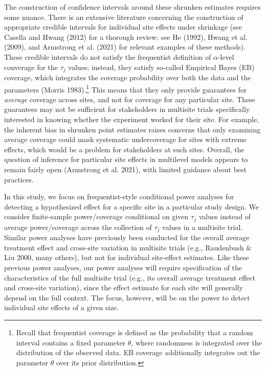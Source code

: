 \documentclass[]{article}
\begin{document}
The construction of confidence intervals around these shrunken estimates requires some nuance.
There is an extensive literature concerning the construction of appropriate credible intervals for individual site effects under shrinkage (see Casella and Hwang (2012) for a thorough review; see He (1992), Hwang et al. (2009), and Armstrong et al. (2021) for relevant examples of these methods).
These credible intervals do not satisfy the frequentist definition of $\alpha$-level converage for the $\tau_j$ values; instead, they satisfy so-called Empirical Bayes (EB) coverage, which integrates the coverage probability over both the data and the parameters (Morris 1983).\footnote{Recall that frequentist coverage is defined as the probability that a random interval contains a fixed parameter $\theta$, where randomness is integrated over the distribution of the observed data.
EB coverage additionally integrates out the parameter $\theta$ over its prior distribution.}
This means that they only provide guarantees for \textit{average} coverage across sites, and not for coverage for any particular site.
These guarantees may not be sufficient for stakeholders in multisite trials specifically interested in knowing whether the experiment worked for their site.
For example, the inherent bias in shrunken point estimates raises concerns that only examining average coverage could mask systematic undercoverage for sites with extreme effects, which would be a problem for stakeholders at such sites.
Overall, the question of inference for particular site effects in multilevel models appears to remain fairly open (Armstrong et al. 2021), with limited guidance about best practices.

In this study, we focus on frequentist-style conditional power analyses for detecting a hypothesized effect for a specific site in a particular study design.
We consider finite-sample power/coverage conditional on given $\tau_j$ values instead of average power/coverage across the collection of $\tau_j$ values in a multisite trial.
Similar power analyses have previously been conducted for the overall average treatment effect and cross-site variation in multisite trials (e.g., Raudenbush \& Liu 2000, many others), but not for individual site-effect estimates.
Like these previous power analyses, our power analyses will require specification of the characteristics of the full multisite trial (e.g., its overall average treatment effect and cross-site variation), since the effect estimate for each site will generally depend on the full context.
The focus, however, will be on the power to detect individual site effects of a given size.
\end{document}

